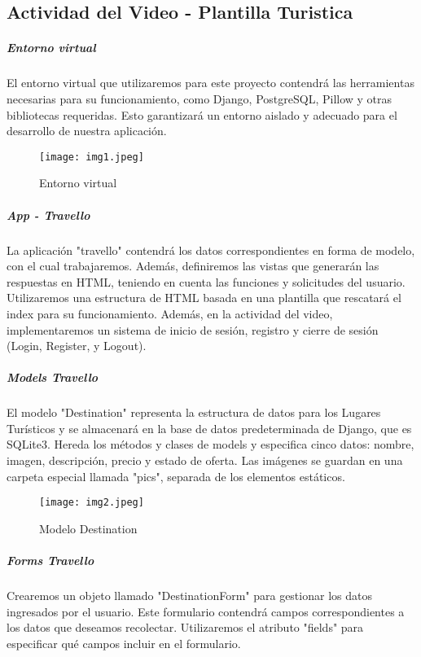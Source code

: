 \documentclass[10pt, a4paper]{article}
\begin{document}
\subsection*{Actividad del Video - Plantilla Turistica}
	\subparagraph*{Entorno virtual}
		\begin{flushleft}
			El entorno virtual que utilizaremos para este proyecto contendrá las herramientas necesarias para su funcionamiento, como Django, PostgreSQL, Pillow y otras bibliotecas requeridas. Esto garantizará un entorno aislado y adecuado para el desarrollo de nuestra aplicación.
		\end{flushleft}
		\begin{figure}[h]
			\centering
			\texttt{[image: img1.jpeg]}
			\caption{Entorno virtual}
		\end{figure}
	\subparagraph*{App - Travello}
		\begin{flushleft}
			La aplicación "travello" contendrá los datos correspondientes en forma de modelo, con el cual trabajaremos. Además, definiremos las vistas que generarán las respuestas en HTML, teniendo en cuenta las funciones y solicitudes del usuario. Utilizaremos una estructura de HTML basada en una plantilla que rescatará el index para su funcionamiento. Además, en la actividad del video, implementaremos un sistema de inicio de sesión, registro y cierre de sesión (Login, Register, y Logout).
		\end{flushleft}
	\vspace*{6cm}
	\subparagraph*{Models Travello}
		\begin{flushleft}
			El modelo "Destination" representa la estructura de datos para los Lugares Turísticos y se almacenará en la base de datos predeterminada de Django, que es SQLite3. Hereda los métodos y clases de models y especifica cinco datos: nombre, imagen, descripción, precio y estado de oferta. Las imágenes se guardan en una carpeta especial llamada "pics", separada de los elementos estáticos.
		\end{flushleft}
		\begin{figure}[h]
			\centering
			\texttt{[image: img2.jpeg]}
			\caption{Modelo Destination}
		\end{figure}
	\subparagraph*{Forms Travello}
		\begin{flushleft}
			Crearemos un objeto llamado "DestinationForm" para gestionar los datos ingresados por el usuario. Este formulario contendrá campos correspondientes a los datos que deseamos recolectar. Utilizaremos el atributo "fields" para especificar qué campos incluir en el formulario.
		\end{flushleft}
\end{document}
